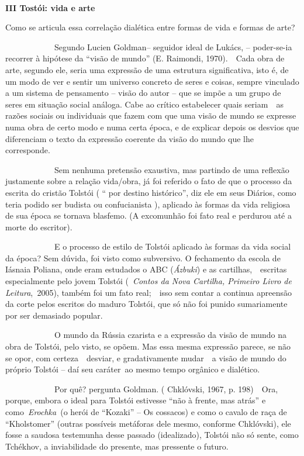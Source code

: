 ~

\textbf{III Tostói: vida e arte}

Como se articula essa correlação dialética entre formas de vida e formas
de arte?

~~~~~~~~~~~~Segundo Lucien Goldman-- seguidor ideal de Lukács, --
poder-se-ia recorrer à hipótese da ``visão de mundo'' (E. Raimondi,
1970).~~Cada obra de arte, segundo ele, seria uma expressão de uma
estrutura significativa, isto é, de um modo de ver e sentir um universo
concreto de seres e coisas, sempre vinculado a um sistema de pensamento
-- visão do autor -- que se impõe a um grupo de seres em situação social
análoga. Cabe ao crítico estabelecer quais seriam~~as razões sociais ou
individuais que fazem com que uma visão de mundo se expresse numa obra
de certo modo e numa certa época, e de explicar depois os desvios que
diferenciam o texto da expressão coerente da visão do mundo que lhe
corresponde.

~~~~~~~~~~~~Sem nenhuma pretensão exaustiva, mas partindo de uma
reflexão justamente sobre a relação vida/obra, já foi referido o fato de
que o processo da escrita do cristão Tolstói ( `` por destino
histórico'', diz ele em seus Diários, como teria podido ser budista ou
confucianista ), aplicado às formas da vida religiosa de sua época se
tornava blasfemo. (A excomunhão foi fato real e perdurou até a morte do
escritor).

~~~~~~~~~~~~E o processo de estilo de Tolstói aplicado às formas da vida
social da época? Sem dúvida, foi visto como subversivo. O fechamento da
escola de Iásnaia Poliana, onde eram estudados o ABC (\emph{Ázbuki}) e
as cartilhas,~~escritas especialmente pelo jovem Tolstói (~\emph{Contos
da Nova Cartilha, Primeiro Livro de Leitura},\emph{~}2005), também foi
um fato real;~~isso sem contar a continua apreensão da corte pelos
escritos do maduro Tolstói, que só não foi punido sumariamente por ser
demasiado popular.

~~~~~~~~~~~~O mundo da Rússia czarista e a expressão da visão de mundo
na obra de Tolstói, pelo visto, se opõem. Mas essa mesma expressão
parece, se não se opor, com certeza~~desviar, e gradativamente mudar~~a
visão de mundo do próprio Tolstói -- daí seu caráter~ao mesmo tempo
orgânico e dialético.

~~~~~~~~~~~~Por quê? pergunta Goldman. ( Chklóvski, 1967, p. 198)~~Ora,
porque, embora o ideal para Tolstói estivesse ``não à frente, mas
atrás'' e como~\emph{Erochka}~(o herói de ``Kozaki'' -- Os cossacos) e
como o cavalo de raça de ``Kholstomer'' (outras possíveis metáforas dele
mesmo, conforme Chklóvski), ele fosse a saudosa testemunha desse passado
(idealizado), Tolstói não só sente, como Tchékhov, a inviabilidade do
presente, mas pressente o futuro.


